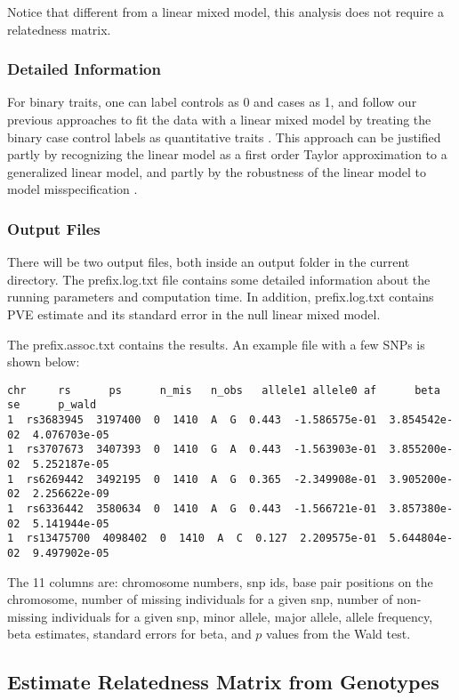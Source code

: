 \documentclass[11pt]{article}
\begin{document}
Notice that different from a linear mixed model, this analysis does not require a relatedness matrix. 

\subsubsection{Detailed Information}
For binary traits, one can label controls as 0 and cases as 1, and follow our previous approaches to fit the data with a linear mixed model by treating the binary case control labels as quantitative traits \cite{Zhou:2012, Zhou:2013}. This approach can be justified partly by recognizing the linear model as a first order Taylor approximation to a generalized linear model, and partly by the robustness of the linear model to model misspecification \cite{Zhou:2013}.


\subsubsection{Output Files}
There will be two output files, both inside an output folder in the current directory. The prefix.log.txt file contains some detailed information about the running parameters and computation time. In addition, prefix.log.txt contains PVE estimate and its standard error in the null linear mixed model.

The prefix.assoc.txt contains the results. An example file with a few SNPs is shown below:
%
\begin{verbatim}
chr     rs      ps      n_mis   n_obs   allele1 allele0 af      beta    se      p_wald
1  rs3683945  3197400  0  1410  A  G  0.443  -1.586575e-01  3.854542e-02  4.076703e-05
1  rs3707673  3407393  0  1410  G  A  0.443  -1.563903e-01  3.855200e-02  5.252187e-05
1  rs6269442  3492195  0  1410  A  G  0.365  -2.349908e-01  3.905200e-02  2.256622e-09
1  rs6336442  3580634  0  1410  A  G  0.443  -1.566721e-01  3.857380e-02  5.141944e-05
1  rs13475700  4098402  0  1410  A  C  0.127  2.209575e-01  5.644804e-02  9.497902e-05
\end{verbatim}
%

The 11 columns are: chromosome numbers, snp ids, base pair positions on the chromosome, number of missing individuals for a given snp, number of non-missing individuals for a given snp, minor allele, major allele, allele frequency, beta estimates, standard errors for beta, and $p$ values from the Wald test. 



\subsection{Estimate Relatedness Matrix from Genotypes}
\end{document}

